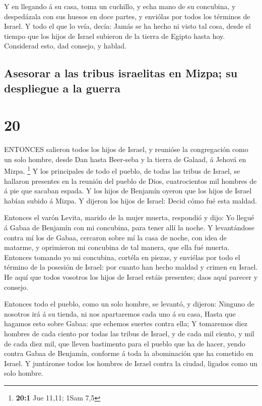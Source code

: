  Y en llegando á su casa, toma un cuchillo, y echa mano de
su concubina, y despedázala con sus huesos en doce partes, y enviólas
por todos los términos de Israel.  Y todo el que lo veía,
decía: Jamás se ha hecho ni visto tal cosa, desde el tiempo que los
hijos de Israel subieron de la tierra de Egipto hasta hoy. Considerad
esto, dad consejo, y hablad.

\hypertarget{asesorar-a-las-tribus-israelitas-en-mizpa-su-despliegue-a-la-guerra}{%
\subsection{Asesorar a las tribus israelitas en Mizpa; su despliegue a
la
guerra}\label{asesorar-a-las-tribus-israelitas-en-mizpa-su-despliegue-a-la-guerra}}

\hypertarget{section-19}{%
\section{20}\label{section-19}}

 ENTONCES salieron todos los hijos de Israel, y reunióse la
congregación como un solo hombre, desde Dan hasta Beer-seba y la tierra
de Galaad, á Jehová en Mizpa. \footnote{\textbf{20:1} Jue 11,11; 1Sam
  7,5}  Y los principales de todo el pueblo, de todas las
tribus de Israel, se hallaron presentes en la reunión del pueblo de
Dios, cuatrocientos mil hombres de á pie que sacaban espada.
 Y los hijos de Benjamín oyeron que los hijos de Israel
habían subido á Mizpa. Y dijeron los hijos de Israel: Decid cómo fué
esta maldad.

 Entonces el varón Levita, marido de la mujer muerta,
respondió y dijo: Yo llegué á Gabaa de Benjamín con mi concubina, para
tener allí la noche.  Y levantándose contra mí los de Gabaa,
cercaron sobre mí la casa de noche, con idea de matarme, y oprimieron mi
concubina de tal manera, que ella fué muerta.  Entonces
tomando yo mi concubina, cortéla en piezas, y enviélas por todo el
término de la posesión de Israel: por cuanto han hecho maldad y crimen
en Israel.  He aquí que todos vosotros los hijos de Israel
estáis presentes; daos aquí parecer y consejo.

 Entonces todo el pueblo, como un solo hombre, se levantó, y
dijeron: Ninguno de nosotros irá á su tienda, ni nos apartaremos cada
uno á su casa,  Hasta que hagamos esto sobre Gabaa: que
echemos suertes contra ella;  Y tomaremos diez hombres de
cada ciento por todas las tribus de Israel, y de cada mil ciento, y mil
de cada diez mil, que lleven bastimento para el pueblo que ha de hacer,
yendo contra Gabaa de Benjamín, conforme á toda la abominación que ha
cometido en Israel.  Y juntáronse todos los hombres de
Israel contra la ciudad, ligados como un solo hombre.

